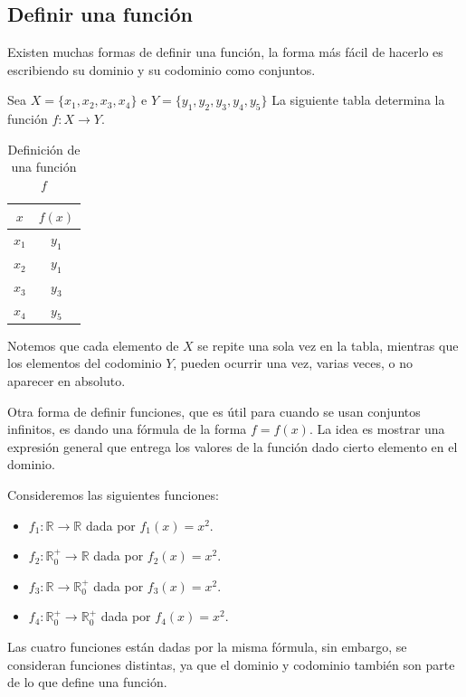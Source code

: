 \documentclass[12pt]{book}
\begin{document}
\subsection{Definir una función}
\noindent
Existen muchas formas de definir una función, la forma más fácil de hacerlo es escribiendo su dominio y su codominio como conjuntos.
\begin{exampleenv}
     Sea $X=\{x_1,x_2,x_3,x_4\}$ e $Y=\{y_1,y_2,y_3,y_4,y_5\}$ La siguiente tabla determina la función $f:X\rightarrow Y$.
     \begin{table}[H]
    \centering
    \begin{tabular}{c|c}
        \toprule
        $x$ & $f(x)$ \\
        \midrule
        $x_1$   & $y_1$  \\
        \hline
        $x_2$   & $y_1$   \\
        \hline
        $x_3$  & $y_3$   \\
        \hline
        $x_4$  & $y_5$  \\
        \bottomrule
    \end{tabular}
    \caption{Definición de una función $f$}
    \label{tab:def_funcion}
    \end{table}

    Notemos que cada elemento de $X$ se repite una sola vez en la tabla, mientras que los elementos del codominio $Y$, pueden ocurrir una vez, varias veces, o no aparecer en absoluto.
\end{exampleenv}

Otra forma de definir funciones, que es útil para cuando se usan conjuntos infinitos, es dando una fórmula de la forma $f=f(x)$. La idea es mostrar una expresión general que entrega los valores de la función dado cierto elemento en el dominio.

\begin{exampleenv}
Consideremos las siguientes funciones:


\begin{itemize}
    \item $f_1:\mathbb{R}\rightarrow \mathbb{R}$ dada por $f_1(x) = x^2$.
    \item $f_2:\mathbb{R}^+_0\rightarrow \mathbb{R}$ dada por $f_2(x) = x^2$.
    \item $f_3:\mathbb{R}\rightarrow \mathbb{R}^+_0$ dada por $f_3(x) = x^2$.
    \item $f_4:\mathbb{R}^+_0\rightarrow \mathbb{R}^+_0$ dada por $f_4(x) = x^2$.\\
\end{itemize}

Las cuatro funciones están dadas por la misma fórmula, sin embargo, se consideran funciones distintas, ya que el dominio y codominio también son parte de lo que define una función.

\end{exampleenv}
\end{document}
